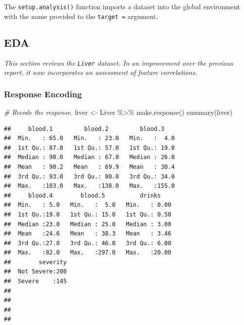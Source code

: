 \documentclass[
  11pt,
  a4paper,
]{scrartcl}
\newenvironment{Shaded}{\begin{snugshade}}{\end{snugshade}}
\newcommand{\CommentTok}[1]{\textcolor[rgb]{0.56,0.35,0.01}{\textit{#1}}}
\newcommand{\FunctionTok}[1]{\textcolor[rgb]{0.00,0.00,0.00}{#1}}
\newcommand{\NormalTok}[1]{#1}
\newcommand{\OtherTok}[1]{\textcolor[rgb]{0.56,0.35,0.01}{#1}}
\newcommand{\SpecialCharTok}[1]{\textcolor[rgb]{0.00,0.00,0.00}{#1}}
\newcommand{\StringTok}[1]{\textcolor[rgb]{0.31,0.60,0.02}{#1}}
\begin{document}
The \texttt{setup.analysis()} function imports a dataset into the global
environment with the name provided to the \texttt{target\ =} argument.

\hypertarget{eda}{%
\subsection{EDA}\label{eda}}

\emph{This section reviews the \texttt{Liver} dataset. In an improvement
over the previous report, it now incorporates an assessment of feature
correlations.}

\hypertarget{response-encoding}{%
\subsubsection{Response Encoding}\label{response-encoding}}

\begin{Shaded}
\begin{Highlighting}[]
\CommentTok{\# Recode the response.}
\NormalTok{liver }\OtherTok{\textless{}{-}}\NormalTok{ Liver }\SpecialCharTok{\%\textgreater{}\%} \FunctionTok{make.response}\NormalTok{()}
\FunctionTok{summary}\NormalTok{(liver)}
\end{Highlighting}
\end{Shaded}

\begin{verbatim}
##     blood.1         blood.2         blood.3     
##  Min.   : 65.0   Min.   : 23.0   Min.   :  4.0  
##  1st Qu.: 87.0   1st Qu.: 57.0   1st Qu.: 19.0  
##  Median : 90.0   Median : 67.0   Median : 26.0  
##  Mean   : 90.2   Mean   : 69.9   Mean   : 30.4  
##  3rd Qu.: 93.0   3rd Qu.: 80.0   3rd Qu.: 34.0  
##  Max.   :103.0   Max.   :138.0   Max.   :155.0  
##     blood.4        blood.5          drinks     
##  Min.   : 5.0   Min.   :  5.0   Min.   : 0.00  
##  1st Qu.:19.0   1st Qu.: 15.0   1st Qu.: 0.50  
##  Median :23.0   Median : 25.0   Median : 3.00  
##  Mean   :24.6   Mean   : 38.3   Mean   : 3.46  
##  3rd Qu.:27.0   3rd Qu.: 46.0   3rd Qu.: 6.00  
##  Max.   :82.0   Max.   :297.0   Max.   :20.00  
##        severity  
##  Not Severe:200  
##  Severe    :145  
##                  
##                  
##                  
## 
\end{verbatim}

\begin{Shaded}
\end{Shaded}
\end{document}
